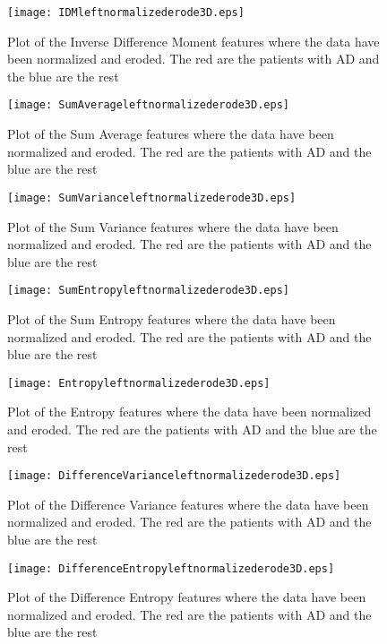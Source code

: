 \begin{figure}[H]
  \centering
  \texttt{[image: IDMleftnormalizederode3D.eps]}
  \caption{Plot of the Inverse Difference Moment features where the data have been normalized and eroded. The red are the patients with AD and the blue are the rest}\label{fig:IDMleftnormalizederode3D}
\end{figure}

\begin{figure}[H]
  \centering
  \texttt{[image: SumAverageleftnormalizederode3D.eps]}
  \caption{Plot of the Sum Average features where the data have been normalized and eroded. The red are the patients with AD and the blue are the rest}\label{fig:SumAverageleftnormalizederode3D}
\end{figure}

\begin{figure}[H]
  \centering
  \texttt{[image: SumVarianceleftnormalizederode3D.eps]}
  \caption{Plot of the Sum Variance features where the data have been normalized and eroded. The red are the patients with AD and the blue are the rest}\label{fig:SumVarianceleftnormalizederode3D}
\end{figure}

\begin{figure}[H]
  \centering
  \texttt{[image: SumEntropyleftnormalizederode3D.eps]}
  \caption{Plot of the Sum Entropy features where the data have been normalized and eroded. The red are the patients with AD and the blue are the rest}\label{fig:SumEntropyleftnormalizederode3D}
\end{figure}

\begin{figure}[H]
  \centering
  \texttt{[image: Entropyleftnormalizederode3D.eps]}
  \caption{Plot of the Entropy features where the data have been normalized and eroded. The red are the patients with AD and the blue are the rest}\label{fig:Entropyleftnormalizederode3D}
\end{figure}

\begin{figure}[H]
  \centering
  \texttt{[image: DifferenceVarianceleftnormalizederode3D.eps]}
  \caption{Plot of the Difference Variance features where the data have been normalized and eroded. The red are the patients with AD and the blue are the rest}\label{fig:DifferenceVarianceleftnormalizederode3D}
\end{figure}

\begin{figure}[H]
  \centering
  \texttt{[image: DifferenceEntropyleftnormalizederode3D.eps]}
  \caption{Plot of the Difference Entropy features where the data have been normalized and eroded. The red are the patients with AD and the blue are the rest}\label{fig:DifferenceEntropyleftnormalizederode3D}
\end{figure}

